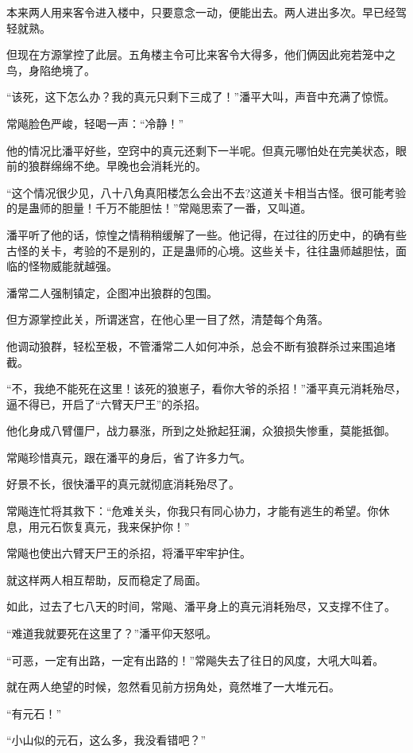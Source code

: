 \begin{this_body}
本来两人用来客令进入楼中，只要意念一动，便能出去。两人进出多次。早已经驾轻就熟。

但现在方源掌控了此层。五角楼主令可比来客令大得多，他们俩因此宛若笼中之鸟，身陷绝境了。

“该死，这下怎么办？我的真元只剩下三成了！”潘平大叫，声音中充满了惊慌。

常飚脸色严峻，轻喝一声：“冷静！”

他的情况比潘平好些，空窍中的真元还剩下一半呢。但真元哪怕处在完美状态，眼前的狼群绵绵不绝。早晚也会消耗光的。

“这个情况很少见，八十八角真阳楼怎么会出不去?这道关卡相当古怪。很可能考验的是蛊师的胆量！千万不能胆怯！”常飚思索了一番，又叫道。

潘平听了他的话，惊惶之情稍稍缓解了一些。他记得，在过往的历史中，的确有些古怪的关卡，考验的不是别的，正是蛊师的心境。这些关卡，往往蛊师越胆怯，面临的怪物威能就越强。

潘常二人强制镇定，企图冲出狼群的包围。

但方源掌控此关，所谓迷宫，在他心里一目了然，清楚每个角落。

他调动狼群，轻松至极，不管潘常二人如何冲杀，总会不断有狼群杀过来围追堵截。

“不，我绝不能死在这里！该死的狼崽子，看你大爷的杀招！”潘平真元消耗殆尽，逼不得已，开启了“六臂天尸王”的杀招。

他化身成八臂僵尸，战力暴涨，所到之处掀起狂澜，众狼损失惨重，莫能抵御。

常飚珍惜真元，跟在潘平的身后，省了许多力气。

好景不长，很快潘平的真元就彻底消耗殆尽了。

常飚连忙将其救下：“危难关头，你我只有同心协力，才能有逃生的希望。你休息，用元石恢复真元，我来保护你！”

常飚也使出六臂天尸王的杀招，将潘平牢牢护住。

就这样两人相互帮助，反而稳定了局面。

如此，过去了七八天的时间，常飚、潘平身上的真元消耗殆尽，又支撑不住了。

“难道我就要死在这里了？”潘平仰天怒吼。

“可恶，一定有出路，一定有出路的！”常飚失去了往日的风度，大吼大叫着。

就在两人绝望的时候，忽然看见前方拐角处，竟然堆了一大堆元石。

“有元石！”

“小山似的元石，这么多，我没看错吧？”


\end{this_body}
